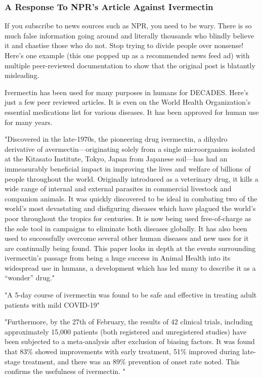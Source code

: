 \documentclass[10pt, a4paper, twocolumn]{book}
\begin{document}
\subsubsection{A Response To NPR's Article Against Ivermectin}

If you subscribe to news sources such as NPR, you need to be wary. There is so much false information going around and literally thousands who blindly believe it and chastise those who do not. Stop trying to divide people over nonsense! Here's one example (this one popped up as a recommended news feed ad) with multiple peer-reviewed documentation to show that the original post is blatantly misleading.

Ivermectin has been used for many purposes in humans for DECADES. Here's just a few peer reviewed articles. It is even on the World Health Organization's essential medications list for various diseases. It has been approved for human use for many years.

"Discovered in the late-1970s, the pioneering drug ivermectin, a dihydro derivative of avermectin—originating solely from a single microorganism isolated at the Kitasato Institute, Tokyo, Japan from Japanese soil—has had an immeasurably beneficial impact in improving the lives and welfare of billions of people throughout the world. Originally introduced as a veterinary drug, it kills a wide range of internal and external parasites in commercial livestock and companion animals. It was quickly discovered to be ideal in combating two of the world’s most devastating and disfiguring diseases which have plagued the world’s poor throughout the tropics for centuries. It is now being used free-of-charge as the sole tool in campaigns to eliminate both diseases globally. It has also been used to successfully overcome several other human diseases and new uses for it are continually being found. This paper looks in depth at the events surrounding ivermectin’s passage from being a huge success in Animal Health into its widespread use in humans, a development which has led many to describe it as a “wonder” drug." \citep{WonderDrug}

"A 5-day course of ivermectin was found to be safe and effective in treating adult patients with mild COVID-19" \citep{FiveDayCourseIvermectin}

"Furthermore, by the 27th of February, the results of 42 clinical trials, including approximately 15,000 patients (both registered and unregistered studies) have been subjected to a meta-analysis after exclusion of biasing factors. It was found that 83\% showed improvements with early treatment, 51\% improved during late-stage treatment, and there was an 89\% prevention of onset rate noted. This confirms the usefulness of ivermectin. " \citep{GlobalTrendsIvermectin}
\end{document}
